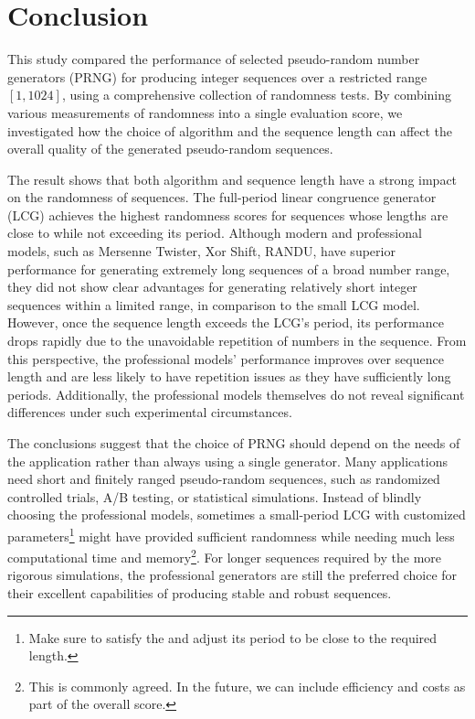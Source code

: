 \documentclass{report}
\begin{document}
\chapter{Conclusion}
This study compared the performance of selected pseudo-random number generators (PRNG) for producing integer sequences over a restricted range $[1,1024]$, using a comprehensive collection of randomness tests. By combining various measurements of randomness into a single evaluation score, we investigated how the choice of algorithm and the sequence length can affect the overall quality of the generated pseudo-random sequences.

The result shows that both algorithm and sequence length have a strong impact on the randomness of sequences. The full-period linear congruence generator (LCG) achieves the highest randomness scores for sequences whose lengths are close to while not exceeding its period. Although modern and professional models, such as Mersenne Twister, Xor Shift, RANDU, have superior performance for generating extremely long sequences of a broad number range, they did not show clear advantages for generating relatively short integer sequences within a limited range, in comparison to the small LCG model. However, once the sequence length exceeds the LCG's period, its performance drops rapidly due to the unavoidable repetition of numbers in the sequence. From this perspective, the professional models' performance improves over sequence length and are less likely to have repetition issues as they have sufficiently long periods. Additionally, the professional models themselves do not reveal significant differences under such experimental circumstances.

The conclusions suggest that the choice of PRNG should depend on the needs of the application rather than always using a single generator. Many applications need short and finitely ranged pseudo-random sequences, such as randomized controlled trials, A/B testing, or statistical simulations. Instead of blindly choosing the professional models, sometimes a small-period LCG with customized parameters\footnote{Make sure to satisfy the  and adjust its period to be close to the required length.} might have provided sufficient randomness while needing much less computational time and memory\footnote{This is commonly agreed. In the future, we can include  efficiency and costs as part of the overall score.}. For longer sequences required by the more rigorous simulations, the professional generators are still the preferred choice for their excellent capabilities of producing stable and robust sequences.
\end{document}
